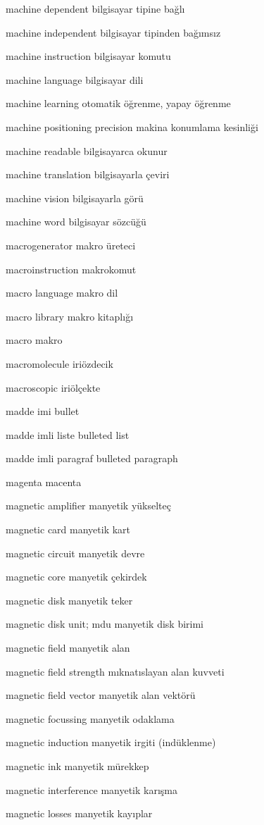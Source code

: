\documentclass[12pt,fleqn]{article}\usepackage{../../common}
\begin{document}
machine dependent bilgisayar tipine bağlı

machine independent bilgisayar tipinden bağımsız

machine instruction bilgisayar komutu

machine language bilgisayar dili

machine learning otomatik öğrenme, yapay öğrenme

machine positioning precision makina konumlama kesinliği

machine readable bilgisayarca okunur

machine translation bilgisayarla çeviri

machine vision bilgisayarla görü

machine word bilgisayar sözcüğü

macrogenerator makro üreteci

macroinstruction makrokomut

macro language makro dil

macro library makro kitaplığı

macro makro

macromolecule iriözdecik

macroscopic iriölçekte

madde imi bullet

madde imli liste bulleted list

madde imli paragraf bulleted paragraph

magenta macenta

magnetic amplifier manyetik yükselteç

magnetic card manyetik kart

magnetic circuit manyetik devre

magnetic core manyetik çekirdek

magnetic disk manyetik teker

magnetic disk unit; mdu manyetik disk birimi

magnetic field manyetik alan

magnetic field strength mıknatıslayan alan kuvveti

magnetic field vector manyetik alan vektörü

magnetic focussing manyetik odaklama

magnetic induction manyetik irgiti (indüklenme)

magnetic ink manyetik mürekkep

magnetic interference manyetik karışma

magnetic losses manyetik kayıplar
\end{document}
